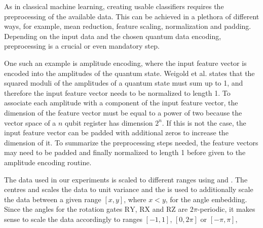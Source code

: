 As in classical machine learning, creating usable classifiers requires the preprocessing of the available data. This can be achieved in a plethora of different ways, for example, mean reduction, feature scaling, normalization and padding. Depending on the input data and the chosen quantum data encoding, preprocessing is a crucial or even mandatory step\cite{PoincarDataPreprocessinForQuantumMachineLearning_2021,VariationalClassifierPennyLane,SHRIVASTAVA20201849}. 

One such an example is amplitude encoding, where the input feature vector is encoded into the amplitudes of the quantum state. Weigold et al. \cite{Weigold2021_EncodingPatternsForQuantumAlgorithms} states that the squared moduli of the amplitudes of a quantum state must sum up to 1, and therefore the input feature vector needs to be normalized to length 1. To associate each amplitude with a component of the input feature vector, the dimension of the feature vector must be equal to a power of two because the vector space of a $n$ qubit register has dimension $2^n$. If this is not the case, the input feature vector can be padded with additional zeros to increase the dimension of it. To summarize the preprocessing steps needed, the  feature vectors may need to be padded and finally normalized to length 1 before given to the amplitude encoding routine.

The data used in our experiments is scaled to different ranges using  \cite{scikit_sklearnpreprocessingminmaxscaler_nodate} and \cite{scikit_sklearnpreprocessingstandardscaler_nodate}. The  centres and scales the data to unit variance and the  is used to additionally scale the data between a given range $[x, y]$, where $x < y$, for the angle embedding. Since the angles for the rotation gates $\mathrm{RY}$, $\mathrm{RX}$ and $\mathrm{RZ}$ are $2\pi$-periodic, it makes sense to scale the data accordingly to ranges $[-1,1]$, $[0,2\pi]$\cite{schuld2021supervised} or $[-\pi,\pi]$, 

